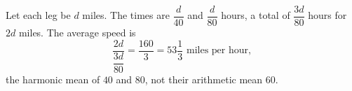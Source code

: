 Let each leg be $d$ miles. The times are $\dfrac{d}{40}$ and $\dfrac{d}{80}$ hours, a total of $\dfrac{3d}{80}$ hours for $2d$ miles. The average speed is
\[\dfrac{2d}{\dfrac{3d}{80}}=\dfrac{160}{3}=\boxed{53\dfrac13\text{ miles per hour}},\]
the harmonic mean of $40$ and $80$, not their arithmetic mean $60$.
